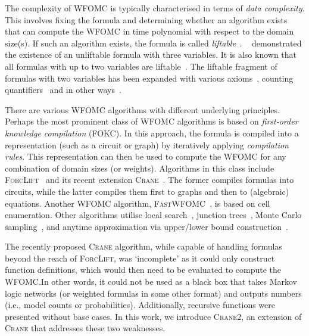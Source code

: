 \documentclass[letterpaper]{article} %
\theoremstyle{remark}
\theoremstyle{definition}
\newcommand{\Cranetwo}{\textsc{Crane2}}
\begin{document}

The complexity of WFOMC is typically characterised in terms of \emph{data
  complexity}. This involves fixing the formula and determining whether an
algorithm exists that can compute the WFOMC in time polynomial with respect to
the domain size(s). If such an algorithm exists, the formula is called
\emph{liftable}~\cite{DBLP:conf/starai/JaegerB12}.
\citeauthor{DBLP:conf/pods/BeameBGS15}~
demonstrated the existence of an unliftable formula with three variables. It is
also known that all formulas with up to two variables are
liftable~\cite{DBLP:conf/nips/Broeck11,DBLP:conf/kr/BroeckMD14}. The liftable
fragment of formulas with two variables has been expanded with various
axioms~\cite{DBLP:conf/aaai/TothK23,DBLP:journals/ai/BremenK23}, counting
quantifiers~\cite{DBLP:journals/jair/Kuzelka21} and in other
ways~\cite{DBLP:conf/nips/KazemiKBP16}.


There are various WFOMC algorithms with different underlying principles. Perhaps
the most prominent class of WFOMC algorithms is based on \emph{first-order
  knowledge compilation} (FOKC). In this approach, the formula is compiled into
a representation (such as a circuit or graph) by iteratively applying
\emph{compilation rules}. This representation can then be used to compute the
WFOMC for any combination of domain sizes (or weights). Algorithms in this class
include \textsc{ForcLift}~\cite{DBLP:conf/ijcai/BroeckTMDR11} and its recent
extension \textsc{Crane}~\cite{DBLP:conf/kr/DilkasB23}. The former compiles
formulas into circuits, while the latter compiles them first to graphs and then
to (algebraic) equations. Another WFOMC algorithm,
\textsc{FastWFOMC}~\cite{DBLP:conf/uai/BremenK21}, is based on cell enumeration.
Other algorithms utilise local search~\cite{DBLP:journals/pvldb/NiuRDS11},
junction trees~\cite{DBLP:conf/aaai/VenugopalSG15}, Monte Carlo
sampling~\cite{DBLP:journals/cacm/GogateD16}, and anytime approximation via
upper/lower bound construction~\cite{DBLP:conf/ijcai/BremenK20}.


The recently proposed \textsc{Crane} algorithm, while capable of handling
formulas beyond the reach of \textsc{ForcLift}, was `incomplete' as it could
only construct function definitions, which would then need to be evaluated to
compute the WFOMC.\@ In other words, it could not be used as a black box that
takes Markov logic networks (or weighted formulas in some other format) and
outputs numbers (i.e., model counts or probabilities). Additionally, recursive
functions were presented without base cases. In this work, we introduce
\Cranetwo{}, an extension of \textsc{Crane} that addresses these two weaknesses.
\end{document}
